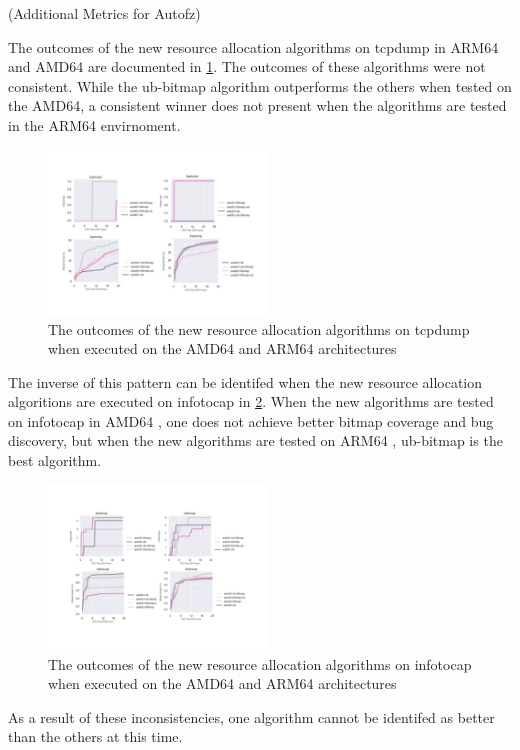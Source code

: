 \substection(Additional Metrics for Autofz)

The outcomes of the new resource allocation algorithms on tcpdump in ARM64 and AMD64 are documented in \ref{figs:tcpdump_algo_compare.png}. 
The outcomes of these algorithms were not consistent. While the ub-bitmap algorithm outperforms the others when tested on the AMD64, a 
consistent winner does not present when the algorithms are tested in the ARM64 envirnoment. 

\begin{figure}
    \includegraphics[width=0.52\textwidth]{figs/tcpdump_algo_compare.png}
    \centering
    \caption{The outcomes of the new resource allocation algorithms on tcpdump when executed on the AMD64 and ARM64 architectures}
    \label{figs:tcpdump_algo_compare.png}
\end{figure}

The inverse of this pattern can be identifed when the new resource allocation algoritions are executed on infotocap in 
\ref{figs:infotocap_algo_compare.png}. When the new algorithms are tested on infotocap in AMD64 , one does not achieve better
bitmap coverage and bug discovery, but when the new algorithms are tested on ARM64 , ub-bitmap is the best algorithm.

\begin{figure}

    \includegraphics[width=0.52\textwidth]{figs/infotocap_algo_compare.png}
    \centering
    \caption{The outcomes of the new resource allocation algorithms on infotocap when executed on the AMD64 and ARM64 architectures}
    \label{figs:infotocap_algo_compare.png}
\end{figure}

As a result of these inconsistencies, one algorithm cannot be identifed as better than the others at this time.



